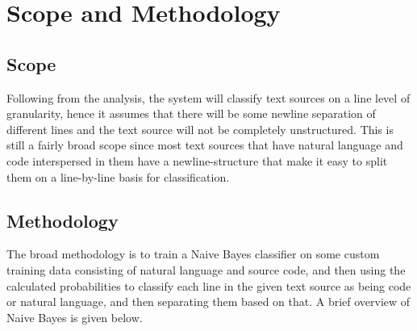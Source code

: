 \documentclass[12pt]{scrreprt}
\begin{document}
\chapter{Scope and Methodology}

\section{Scope}
Following from the analysis, the system will classify text sources on a line level of granularity, hence it assumes that there will be some newline separation of different lines and the text source will not be completely unstructured. This is still a fairly broad scope since most text sources that have natural language and code interspersed in them have a newline-structure that make it easy to split them on a line-by-line basis for classification. 


\section{Methodology}

The broad methodology is to train a Naive Bayes classifier on some custom training data consisting of natural language and source code, and then using the calculated probabilities to classify each line in the given text source as being code or natural language, and then separating them based on that. A brief overview of Naive Bayes is given below.
\end{document}
